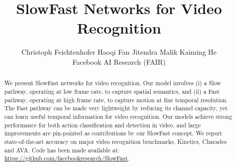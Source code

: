 \documentclass[10pt,twocolumn,letterpaper]{article}
\begin{document}
	
	
	\title{\vspace{-.5em} SlowFast Networks for Video Recognition \\ \vspace{-.5em}}
	
	\author{
		Christoph Feichtenhofer \qquad
		Haoqi Fan \qquad
		Jitendra Malik \qquad
		Kaiming He \vspace{.8em}\\
		Facebook AI Research (FAIR)
	}
	
	\maketitle
	
	\newcommand{\fastcolor}[1]{\textcolor{fastcolor}{\textbf{#1}}}
	\newcommand{\fastcolorC}[1]{\textcolor{orange}{#1}}
	\newcommand{\slowcolor}[1]{\textcolor{slowcolor}{#1}}
	
	\newcommand{\slow}{\slowcolor{Slow }}
	\newcommand{\fast}{\fastcolor{Fast }}
	
	\newcommand{\predictioncolor}[1]{\textcolor{predictioncolor}{#1}}
	\newcommand{\labelcolor}[1]{\textcolor{labelcolor}{#1}}
	
	\newcommand{\pred}{\predictioncolor{\textbf{Predictions}: }}
	\newcommand{\gt}{\labelcolor{\textbf{Labels}: }}
	
	
	\newcommand{\demph}[1]{\textcolor{demphcolor}{#1}}
	
	\thispagestyle{empty}
	
	
	\begin{abstract}
		\vspace{-.2em}
		We present SlowFast networks for video recognition. Our model involves (i) a Slow pathway, operating at low frame rate, to capture spatial semantics, and (ii) a Fast pathway, operating at high frame rate, to capture motion at fine temporal resolution. The Fast pathway can be made very lightweight by reducing its channel capacity, yet can learn useful temporal information for video recognition.
		Our models achieve strong performance for both action classification and detection in video, and large improvements are pin-pointed as contributions by our SlowFast concept. 
		We report state-of-the-art accuracy on major video recognition benchmarks, Kinetics, Charades and AVA. Code has been made available at: \url{https://github.com/facebookresearch/SlowFast}. 
	\end{abstract}
	
\end{document}
